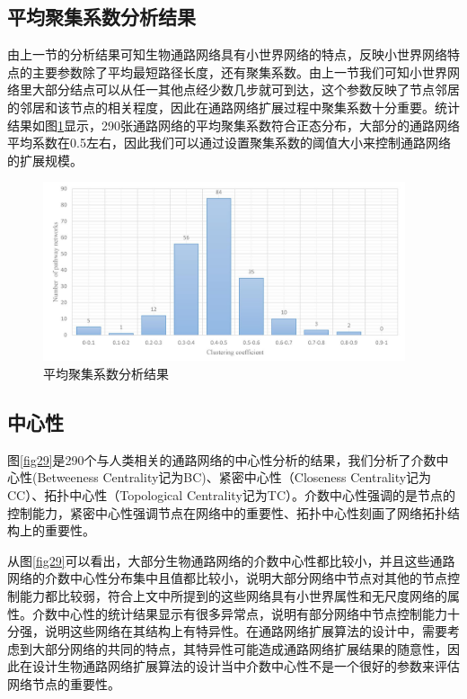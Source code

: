 \subsection{平均聚集系数分析结果}

由上一节的分析结果可知生物通路网络具有小世界网络的特点，反映小世界网络特点的主要参数除了平均最短路径长度，还有聚集系数。由上一节我们可知小世界网络里大部分结点可以从任一其他点经少数几步就可到达，这个参数反映了节点邻居的邻居和该节点的相关程度，因此在通路网络扩展过程中聚集系数十分重要。统计结果如图\ref{fig28}显示，290张通路网络的平均聚集系数符合正态分布，大部分的通路网络平均系数在0.5左右，因此我们可以通过设置聚集系数的阈值大小来控制通路网络的扩展规模。
\begin{figure}[h]
\centering
\includegraphics[width = 0.95\textwidth]{cc}
\caption[fig28]{平均聚集系数分析结果}
\label{fig28}
\end{figure}

\subsection{中心性}
图\ref{fig29}是290个与人类相关的通路网络的中心性分析的结果，我们分析了介数中心性(Betweeness Centrality记为BC)、紧密中心性（Closeness Centrality记为CC）、拓扑中心性（Topological Centrality记为TC）。介数中心性强调的是节点的控制能力，紧密中心性强调节点在网络中的重要性、拓扑中心性刻画了网络拓扑结构上的重要性。

从图\ref{fig29}可以看出，大部分生物通路网络的介数中心性都比较小，并且这些通路网络的介数中心性分布集中且值都比较小，说明大部分网络中节点对其他的节点控制能力都比较弱，符合上文中所提到的这些网络具有小世界属性和无尺度网络的属性。介数中心性的统计结果显示有很多异常点，说明有部分网络中节点控制能力十分强，说明这些网络在其结构上有特异性。在通路网络扩展算法的设计中，需要考虑到大部分网络的共同的特点，其特异性可能造成通路网络扩展结果的随意性，因此在设计生物通路网络扩展算法的设计当中介数中心性不是一个很好的参数来评估网络节点的重要性。

